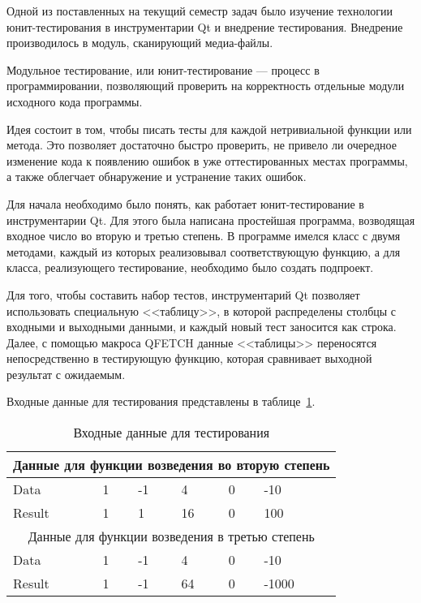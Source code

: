 Одной из поставленных на текущий семестр задач было изучение технологии юнит-тестирования в инструментарии Qt и внедрение тестирования. Внедрение производилось в модуль, сканирующий медиа-файлы.

Модульное тестирование, или юнит-тестирование --- процесс в программировании, позволяющий проверить на корректность отдельные модули исходного кода программы.

Идея состоит в том, чтобы писать тесты для каждой нетривиальной функции или метода. Это позволяет достаточно быстро проверить, не привело ли очередное изменение кода к появлению ошибок в уже оттестированных местах программы, а также облегчает обнаружение и устранение таких ошибок.

Для начала необходимо было понять, как работает юнит-тестирование в инструментарии Qt. Для этого была написана простейшая программа, возводящая входное число во вторую и третью степень. В программе имелся класс с двумя методами, каждый из которых реализовывал соответствующую функцию, а для класса, реализующего тестирование, необходимо было создать подпроект.

Для того, чтобы составить набор тестов, инструментарий Qt позволяет использовать специальную <<таблицу>>, в которой распределены столбцы с входными и выходными данными, и каждый новый тест заносится как строка. Далее, с помощью макроса QFETCH данные <<таблицы>> переносятся непосредственно в тестирующую функцию, которая сравнивает выходной результат с ожидаемым.

Входные данные для тестирования представлены в таблице~\ref{tab:1}.

\begin{table}[h]
\caption{ Входные данные для тестирования }
\label{tab:1}
\begin{center}
\begin{tabularx}{\linewidth}{|X|X|X|X|X|X|}
\hline
\multicolumn{6}{|c|}{Данные для функции возведения во вторую степень} \\
\hline
Data & 1 & -1 & 4 & 0 & -10 \\
\hline
Result & 1 & 1 & 16 & 0 & 100 \\
\hline
\multicolumn{6}{|c|}{Данные для функции возведения в третью степень} \\
\hline
Data & 1 & -1 & 4 & 0 & -10 \\
\hline
Result & 1 & -1 & 64 & 0 & -1000 \\
\hline
\end{tabularx}
\end{center}
\end{table}

